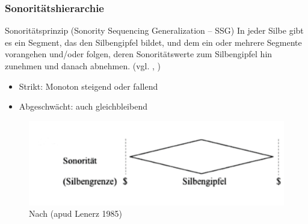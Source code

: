 \begin{frame}
\frametitle{Sonoritätshierarchie}


\begin{block}{Sonoritätsprinzip (Sonority Sequencing Generalization -- SSG)}
In jeder Silbe gibt es ein Segment, das den Silbengipfel bildet, und dem ein oder mehrere Segmente vorangehen und/oder folgen, deren Sonoritätswerte zum Silbengipfel hin zunehmen und danach abnehmen. (vgl. \citealt[225]{Hall00a}, \citealt[94]{Ramers08a})
\end{block}

\begin{itemize}
	\item Strikt: Monoton steigend oder fallend
	\item Abgeschwächt: auch gleichbleibend \citep[vgl.][]{Hall00a}

\end{itemize}

\begin{figure}
\centering
\includegraphics[scale=.2]{material/03bSonoritaetRamers}
\caption{Nach \citet[93]{Ramers08a} (apud Lenerz 1985)}
\end{figure}

\end{frame}




